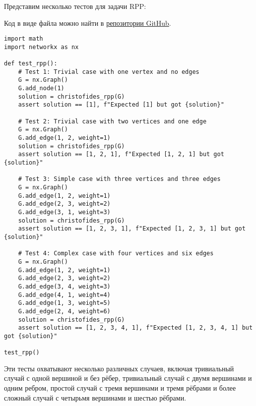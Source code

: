 Представим несколько тестов для задачи RPP:

Код в виде файла можно найти в \href{https://github.com/stepan-karpov/compl-project/blob/main/code/test_rpp.py}{репозитории GitHub}.

\begin{verbatim}
import math
import networkx as nx

def test_rpp():
    # Test 1: Trivial case with one vertex and no edges
    G = nx.Graph()
    G.add_node(1)
    solution = christofides_rpp(G)
    assert solution == [1], f"Expected [1] but got {solution}"

    # Test 2: Trivial case with two vertices and one edge
    G = nx.Graph()
    G.add_edge(1, 2, weight=1)
    solution = christofides_rpp(G)
    assert solution == [1, 2, 1], f"Expected [1, 2, 1] but got {solution}"

    # Test 3: Simple case with three vertices and three edges
    G = nx.Graph()
    G.add_edge(1, 2, weight=1)
    G.add_edge(2, 3, weight=2)
    G.add_edge(3, 1, weight=3)
    solution = christofides_rpp(G)
    assert solution == [1, 2, 3, 1], f"Expected [1, 2, 3, 1] but got {solution}"

    # Test 4: Complex case with four vertices and six edges
    G = nx.Graph()
    G.add_edge(1, 2, weight=1)
    G.add_edge(2, 3, weight=2)
    G.add_edge(3, 4, weight=3)
    G.add_edge(4, 1, weight=4)
    G.add_edge(1, 3, weight=5)
    G.add_edge(2, 4, weight=6)
    solution = christofides_rpp(G)
    assert solution == [1, 2, 3, 4, 1], f"Expected [1, 2, 3, 4, 1] but got {solution}"

test_rpp()
\end{verbatim}
Эти тесты охватывают несколько различных случаев, включая тривиальный случай с одной вершиной и без рёбер, тривиальный случай с двумя вершинами и одним ребром, простой случай с тремя вершинами и тремя рёбрами и более сложный случай с четырьмя вершинами и шестью рёбрами.